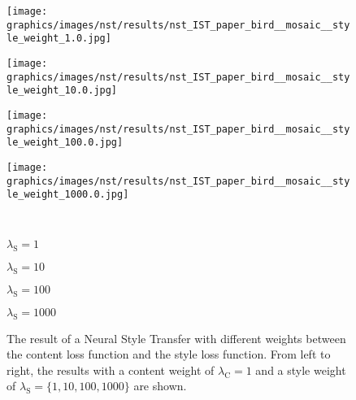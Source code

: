 \begin{figure}
	\centering
	\begin{minipage}{.25\textwidth}
		\centering
		\texttt{[image: graphics/images/nst/results/nst\_IST\_paper\_bird\_\_mosaic\_\_style\_weight\_1.0.jpg]}
	\end{minipage}%
	\begin{minipage}{.25\textwidth}
		\centering
		\texttt{[image: graphics/images/nst/results/nst\_IST\_paper\_bird\_\_mosaic\_\_style\_weight\_10.0.jpg]}
	\end{minipage}%
	\begin{minipage}{.25\textwidth}
		\centering
		\texttt{[image: graphics/images/nst/results/nst\_IST\_paper\_bird\_\_mosaic\_\_style\_weight\_100.0.jpg]}
	\end{minipage}%
	\begin{minipage}{.25\textwidth}
		\centering
		\texttt{[image: graphics/images/nst/results/nst\_IST\_paper\_bird\_\_mosaic\_\_style\_weight\_1000.0.jpg]}
	\end{minipage}\\ \vspace{0.15cm}
	\begin{minipage}{.25\textwidth}
		\centering
		$\lambda_\text{S} = 1$
	\end{minipage}%
	\begin{minipage}{.25\textwidth}
		\centering
		$\lambda_\text{S} = 10$
	\end{minipage}%
	\begin{minipage}{.25\textwidth}
		\centering
		$\lambda_\text{S} = 100$
	\end{minipage}%
	\begin{minipage}{.25\textwidth}
		\centering
		$\lambda_\text{S} = 1000$
	\end{minipage}
	\caption{The result of a Neural Style Transfer with different weights between the content loss function and the style loss function. From left to right, the results with a content weight of $\lambda_\text{C} = 1$ and a style weight of  $\lambda_\text{S} = \{1, 10, 100, 1000\}$ are shown.}
	\label{fig:weighting_nst}
\end{figure}

